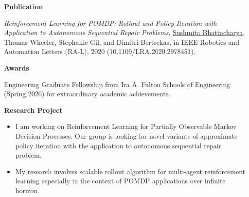 \documentclass[a4paper,11pt]{article}
\newcommand{\resheading}[1]{{\small \colorbox{mygrey}{\begin{minipage}{0.975\textwidth}{\textbf{#1 \vphantom{p\^{E}}}}\end{minipage}}}}
\begin{document}
\resheading{\textbf{\large Publication}}
\begin{description}
	\item \hspace{0.65 cm} \textit{Reinforcement Learning for POMDP: Rollout and Policy Iteration with Application to Autonomous Sequential Repair Problems}, \underline{Sushmita Bhattacharya}, Thomas Wheeler, Stephanie Gil, and Dimitri Bertsekas, in IEEE Robotics and Automation Letters (RA-L), 2020 (10.1109/LRA.2020.2978451).
\end{description}

\resheading{\textbf{\large Awards}}
\begin{description}
	\item \hspace{0.65 cm} Engineering Graduate Fellowship from Ira A. Fulton Schools of Engineering (Spring 2020) for extraordinary academic achievements.
	
\end{description}

\resheading{\textbf{\large Research Project}}
\begin{description}
	\item 
	\begin{itemize}
		\item I am working on Reinforcement Learning for Partially Observable Markov Decision Processes. Our group is looking for novel variants of approximate policy iteration with the application to autonomous sequential repair problem. 
	\end{itemize}
\item 
	\begin{itemize}
		\item My research involves scalable rollout algorithm for multi-agent reinforcement learning especially in the context of POMDP applications over infinite horizon.
	\end{itemize}
\end{description}
\end{document}
